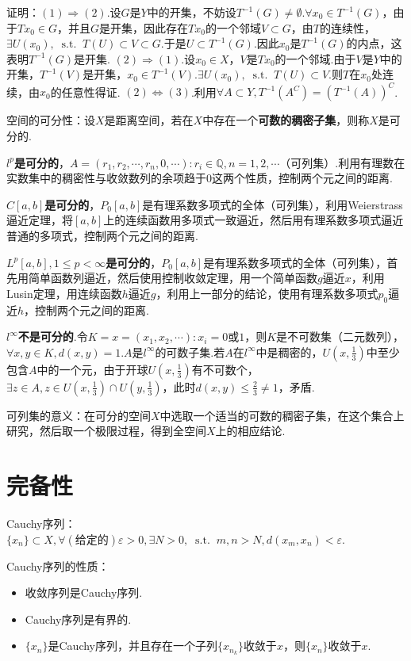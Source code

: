 \documentclass[bwprint, withoutpreface]{cumcmthesis}
\newcommand*{\st}{\mathop{}\!\mathrm{s.t.}\!\mathop{}}
\begin{document}
证明：$(1) \Rightarrow (2).$设$G$是$Y$中的开集，不妨设$T^{-1}(G) \neq \emptyset$.$\forall x_0 \in T^{-1}(G)$，由于$Tx_0 \in G$，并且$G$是开集，因此存在$Tx_0$的一个邻域$V \subset G$，由$T$的连续性，$\exists U(x_0), \st T(U) \subset V \subset G$.于是$U \subset T^{-1}(G)$.因此$x_0$是$T^{-1}(G)$的内点，这表明$T^{-1}(G)$是开集.
$(2) \Rightarrow (1)$.设$x_0 \in X$，$V$是$Tx_0$的一个邻域.由于$V$是$Y$中的开集，$T^{-1}(V)$是开集，$x_0 \in T^{-1}(V)$.$\exists U(x_0), \st T(U) \subset V $.则$T$在$x_0$处连续，由$x_0$的任意性得证.
$(2) \Leftrightarrow (3)$.利用$\forall A \subset Y, T^{-1}(A^C) = {(T^{-1}(A))}^C$.

空间的可分性：设$X$是距离空间，若在$X$中存在一个\textbf{可数的稠密子集}，则称$X$是可分的.

\textbf{$l^p$是可分的}，$A = {(r_1, r_2, \cdots, r_n, 0, \cdots): r_i \in \mathbb{Q}, n = 1, 2, \cdots}$（可列集）.利用有理数在实数集中的稠密性与收敛数列的余项趋于0这两个性质，控制两个元之间的距离.

\textbf{$C[a, b]$是可分的}，$P_0[a, b]$是有理系数多项式的全体（可列集），利用Weierstrass逼近定理，将$[a, b]$上的连续函数用多项式一致逼近，然后用有理系数多项式逼近普通的多项式，控制两个元之间的距离.

\textbf{$L^p[a, b], 1 \leqslant p < \infty$是可分的}，$P_0[a, b]$是有理系数多项式的全体（可列集），首先用简单函数列逼近，然后使用控制收敛定理，用一个简单函数$g$逼近$x$，利用Lusin定理，用连续函数$h$逼近$g$，利用上一部分的结论，使用有理系数多项式$p_0$逼近$h$，控制两个元之间的距离.

\textbf{$l^{\infty}$不是可分的}.令$K = {x = (x_1, x_2, \cdots): x_i = 0 \mbox{或} 1}$，则$K$是不可数集（二元数列），$\forall x, y \in K, d(x, y) = 1$.$A$是$l^{\infty}$的可数子集.若$A$在$l^{\infty}$中是稠密的，$U(x, \frac{1}{3})$中至少包含$A$中的一个元，由于开球$U(x, \frac{1}{3})$有不可数个，$\exists z \in A, z \in U(x, \frac{1}{3}) \cap U(y, \frac{1}{3})$，此时$d(x, y) \leqslant \frac{2}{3} \neq 1$，矛盾.

可列集的意义：在可分的空间$X$中选取一个适当的可数的稠密子集，在这个集合上研究，然后取一个极限过程，得到全空间$X$上的相应结论.

\section{完备性}
Cauchy序列：$\{x_n\} \subset X, \forall (\mbox{给定的}) \varepsilon > 0, \exists N > 0, \st m, n > N, d(x_m, x_n) < \varepsilon$.

Cauchy序列的性质：
\begin{itemize}[itemindent=2em]
	\item 收敛序列是Cauchy序列.
	\item Cauchy序列是有界的.
	\item $\{x_n\}$是Cauchy序列，并且存在一个子列$\{x_{n_k}\}$收敛于$x$，则$\{x_n\}$收敛于$x$.
\end{itemize}
\end{document}
